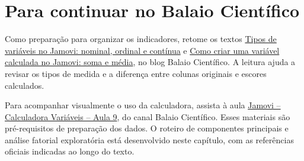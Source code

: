 \section{Para continuar no Balaio Científico}

Como preparação para organizar os indicadores, retome os textos \href{https://www.balaiocientifico.com/2026/10/tipos-de-variaveis-no-jamovi-nominal.html}{Tipos de variáveis no Jamovi: nominal, ordinal e contínua} e \href{https://www.balaiocientifico.com/2026/10/como-criar-uma-variavel-calculada-no.html}{Como criar uma variável calculada no Jamovi: soma e média}, no blog Balaio Científico. A leitura ajuda a revisar os tipos de medida e a diferença entre colunas originais e escores calculados.

Para acompanhar visualmente o uso da calculadora, assista à aula \href{https://www.youtube.com/watch?v=NBvQphd9FqI}{Jamovi -- Calculadora Variáveis -- Aula 9}, do canal Balaio Científico. Esses materiais são pré-requisitos de preparação dos dados. O roteiro de componentes principais e análise fatorial exploratória está desenvolvido neste capítulo, com as referências oficiais indicadas ao longo do texto.
